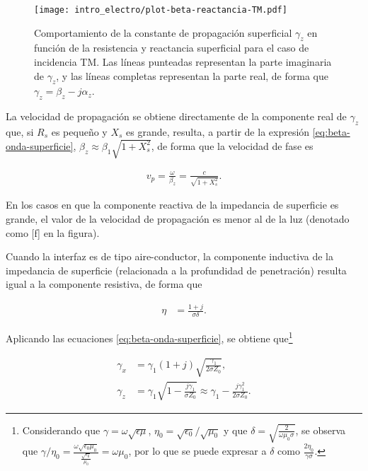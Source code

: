 \begin{figure}[htp]
	\centering
	\texttt{[image: intro\_electro/plot-beta-reactancia-TM.pdf]}
	\caption{Comportamiento de la constante de propagación superficial $\gamma_z$ en función de la resistencia y reactancia superficial para el caso de incidencia TM. Las líneas punteadas representan la parte imaginaria de $\gamma_z$, y las líneas completas representan la parte real, de forma que $\gamma_z = \beta_z - j\alpha_z$.}
	\label{fig:beta-reactancia-TM}
\end{figure}

La velocidad de propagación se obtiene directamente de la componente real de $\gamma_z$ que, si $R_s$ es pequeño y $X_s$ es grande, resulta, a partir de la expresión \ref{eq:beta-onda-superficie}, $\beta_z \approx \beta_1 \sqrt{1+X_s^2}$, de forma que la velocidad de fase es

\begin{align}
	v_p = \frac{\omega}{\beta_z} = \frac{c}{\sqrt{1+X_s^2}}.
\end{align}

En los casos en que la componente reactiva de la impedancia de superficie es grande, el valor de la velocidad de propagación es menor al de la luz (denotado como [f] en la figura).


Cuando la interfaz es de tipo aire-conductor, la componente inductiva de la impedancia de superficie (relacionada a la profundidad de penetración) resulta igual a la componente resistiva, de forma que \cite{Fernandez:Electromag}

\begin{align}
	\eta &= \frac{1+j}{\sigma \delta}.
\end{align}
 
Aplicando las ecuaciones \ref{eq:beta-onda-superficie}, se obtiene que\footnote{Considerando que $\gamma=\omega\sqrt{\epsilon \mu}$, $\eta_0=\sqrt{\epsilon_0}/\sqrt{\mu_0}$ y que $\delta=\sqrt{\frac{2}{\omega \mu_0 \sigma}}$, se observa que $\gamma/\eta_0=\frac{\omega \sqrt{\epsilon_0 \mu_0}}{\frac{\sqrt{\epsilon_0}}{\mu_0}}=\omega \mu_0$, por lo que se puede expresar a $\delta$ como $\frac{2 \eta_0}{\gamma \sigma}$.}

\begin{align}
	\gamma_x &= \gamma_1 (1+j) \sqrt{\frac{\gamma_1}{2 \sigma Z_0}}, \\
	\gamma_z &= \gamma_1 \sqrt{1-\frac{j \gamma_1}{\sigma Z_0}} \approx \gamma_1 - \frac{j  \gamma_1^2}{2 \sigma Z_0}.
\end{align}

